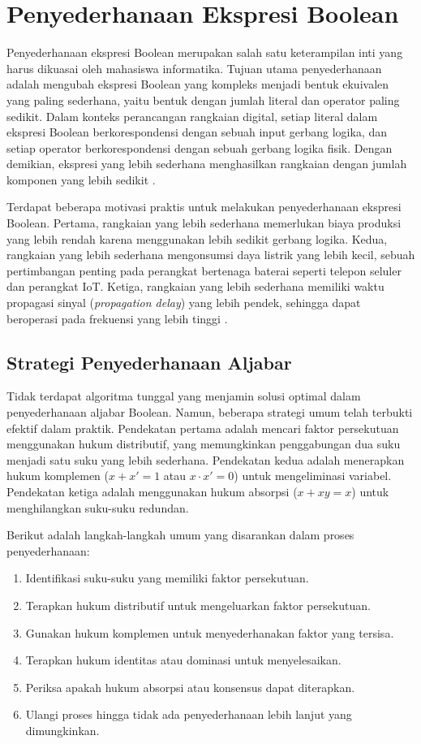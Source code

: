 \section{Penyederhanaan Ekspresi Boolean}

Penyederhanaan ekspresi Boolean merupakan salah satu keterampilan inti yang harus dikuasai oleh mahasiswa informatika. Tujuan utama penyederhanaan adalah mengubah ekspresi Boolean yang kompleks menjadi bentuk ekuivalen yang paling sederhana, yaitu bentuk dengan jumlah literal dan operator paling sedikit. Dalam konteks perancangan rangkaian digital, setiap literal dalam ekspresi Boolean berkorespondensi dengan sebuah input gerbang logika, dan setiap operator berkorespondensi dengan sebuah gerbang logika fisik. Dengan demikian, ekspresi yang lebih sederhana menghasilkan rangkaian dengan jumlah komponen yang lebih sedikit \cite{rosen2019}.

Terdapat beberapa motivasi praktis untuk melakukan penyederhanaan ekspresi Boolean. Pertama, rangkaian yang lebih sederhana memerlukan biaya produksi yang lebih rendah karena menggunakan lebih sedikit gerbang logika. Kedua, rangkaian yang lebih sederhana mengonsumsi daya listrik yang lebih kecil, sebuah pertimbangan penting pada perangkat bertenaga baterai seperti telepon seluler dan perangkat IoT. Ketiga, rangkaian yang lebih sederhana memiliki waktu propagasi sinyal (\textit{propagation delay}) yang lebih pendek, sehingga dapat beroperasi pada frekuensi yang lebih tinggi \cite{allaboutcircuits_boolean}.

\subsection{Strategi Penyederhanaan Aljabar}

Tidak terdapat algoritma tunggal yang menjamin solusi optimal dalam penyederhanaan aljabar Boolean. Namun, beberapa strategi umum telah terbukti efektif dalam praktik. Pendekatan pertama adalah mencari faktor persekutuan menggunakan hukum distributif, yang memungkinkan penggabungan dua suku menjadi satu suku yang lebih sederhana. Pendekatan kedua adalah menerapkan hukum komplemen ($x + x' = 1$ atau $x \cdot x' = 0$) untuk mengeliminasi variabel. Pendekatan ketiga adalah menggunakan hukum absorpsi ($x + xy = x$) untuk menghilangkan suku-suku redundan.

Berikut adalah langkah-langkah umum yang disarankan dalam proses penyederhanaan:

\begin{enumerate}
  \item Identifikasi suku-suku yang memiliki faktor persekutuan.
  \item Terapkan hukum distributif untuk mengeluarkan faktor persekutuan.
  \item Gunakan hukum komplemen untuk menyederhanakan faktor yang tersisa.
  \item Terapkan hukum identitas atau dominasi untuk menyelesaikan.
  \item Periksa apakah hukum absorpsi atau konsensus dapat diterapkan.
  \item Ulangi proses hingga tidak ada penyederhanaan lebih lanjut yang dimungkinkan.
\end{enumerate}

